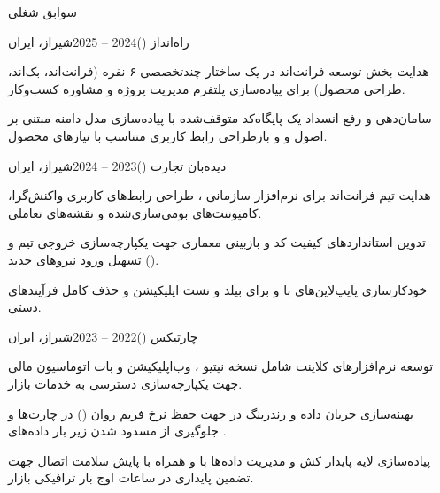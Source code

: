 \documentclass[
	a4paper,
	11pt,
]{resume_fa}
\begin{document}
\begin{rSection}{سوابق شغلی}

    \begin{rSubsection}{راه‌انداز ()}{2024 -- 2025}{}{شیراز، ایران}
        \item هدایت بخش توسعه فرانت‌اند در یک ساختار چندتخصصی ۶ نفره (فرانت‌اند، بک‌اند، طراحی محصول) برای پیاده‌سازی پلتفرم مدیریت پروژه و مشاوره کسب‌وکار.
        \item سامان‌دهی و رفع انسداد یک پایگاه‌کد متوقف‌شده با پیاده‌سازی مدل دامنه مبتنی بر اصول  و  و بازطراحی رابط کاربری متناسب با نیازهای محصول.
        \\      
    \end{rSubsection}

    \begin{rSubsection}{دیده‌بان تجارت ()}{2023 -- 2024}{}{شیراز، ایران}
        \item هدایت تیم فرانت‌اند برای نرم‌افزار سازمانی ، طراحی رابط‌های کاربری واکنش‌گرا، کامپوننت‌های بومی‌سازی‌شده و نقشه‌های تعاملی.
        \item تدوین استانداردهای کیفیت کد و بازبینی معماری جهت یکپارچه‌سازی خروجی تیم و تسهیل ورود نیروهای جدید ().
        \item خودکارسازی پایپ‌لاین‌های  با  و  برای بیلد و تست اپلیکیشن و حذف کامل فرآیندهای دستی.
        \\       
    \end{rSubsection}

    \begin{rSubsection}{چارتیکس ()}{2022 -- 2023}{}{شیراز، ایران}
        \item توسعه نرم‌افزارهای کلاینت شامل نسخه نیتیو ، وب‌اپلیکیشن  و بات اتوماسیون مالی جهت یکپارچه‌سازی دسترسی به خدمات بازار.
        \item بهینه‌سازی جریان داده و رندرینگ  در  جهت حفظ نرخ فریم روان () در چارت‌ها و جلوگیری از مسدود شدن  زیر بار داده‌های .
        \item پیاده‌سازی لایه پایدار کش و مدیریت داده‌ها با  و  همراه با پایش سلامت اتصال جهت تضمین پایداری در ساعات اوج بار ترافیکی بازار.
        \\        
    \end{rSubsection}


\end{rSection}
\end{document}

